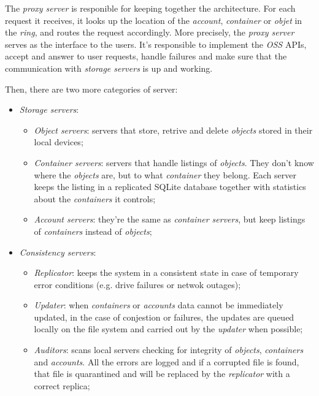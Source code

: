 \noindent
The \emph{proxy server} is responible for keeping together the architecture.
For each request it receives, it looks up the location of the \emph{account},
\emph{container} or \emph{objet} in the \emph{ring}, and routes the request
accordingly. More precisely, the \emph{proxy server} serves as the interface
to the users. It's responsible to implement the \emph{OSS} APIs, accept and
answer to user requests, handle failures and make sure that the communication
with \emph{storage servers} is up and working.

Then, there are two more categories of server:
\begin{itemize}
    \item \emph{Storage servers}:
    \begin{itemize}
        \item \emph{Object servers}: servers that store, retrive and delete
        \emph{objects} stored in their local devices;
        \item \emph{Container servers}: servers that handle listings of
        \emph{objects}. They don't know where the \emph{objects} are, but to
        what \emph{container} they belong. Each server keeps the listing in a
        replicated SQLite database together with statistics about the
        \emph{containers} it controls;
        \item \emph{Account servers}: they're the same as \emph{container servers},
        but keep listings of \emph{containers} instead of \emph{objects};
    \end{itemize}
    \item \emph{Consistency servers}:
    \begin{itemize}
        \item \emph{Replicator}: keeps the system in a consistent state in case
        of temporary error conditions (e.g. drive failures or netwok outages);
        \item \emph{Updater}: when \emph{containers} or \emph{accounts} data
        cannot be immediately updated, in the case of conjestion or failures,
        the updates are queued locally on the file system and carried out by
        the \emph{updater} when possible;
        \item \emph{Auditors}: scans local servers checking for integrity of
        \emph{objects}, \emph{containers} and \emph{accounts}. All the errors
        are logged and if a corrupted file is found, that file is quarantined
        and will be replaced by the \emph{replicator} with a correct replica;
    \end{itemize}
\end{itemize}

